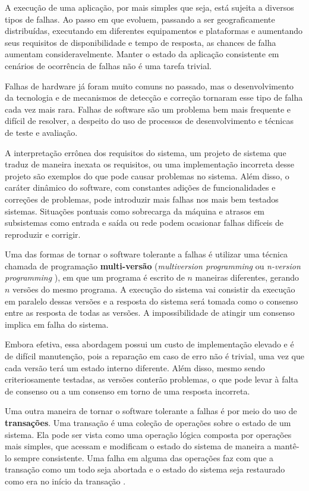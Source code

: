 \documentclass[11pt,twoside,a4paper]{book}
\begin{document}
A execução de uma aplicação, por mais simples que seja, está sujeita a diversos tipos de falhas. Ao passo em que evoluem, passando a ser geograficamente distribuídas, executando em diferentes equipamentos e plataformas e aumentando seus requisitos de disponibilidade e tempo de resposta, as chances de falha aumentam consideravelmente. Manter o estado da aplicação consistente em cenários de ocorrência de falhas não é uma tarefa trivial.

Falhas de hardware já foram muito comuns no passado, mas o desenvolvimento da tecnologia e de mecanismos de detecção e correção tornaram esse tipo de falha cada vez mais rara. Falhas de software são um problema bem mais frequente e difícil de resolver, a despeito do uso de processos de desenvolvimento e técnicas de teste e avaliação.

A interpretação errônea dos requisitos do sistema, um projeto de sistema que traduz de maneira inexata os requisitos, ou uma implementação incorreta desse projeto são exemplos do que pode causar problemas no sistema. Além disso, o caráter dinâmico do software, com constantes adições de funcionalidades e correções de problemas, pode introduzir mais falhas nos mais bem testados sistemas. Situações pontuais como sobrecarga da máquina e atrasos em subsistemas como entrada e saída ou rede podem ocasionar falhas difíceis de reproduzir e corrigir.

Uma das formas de tornar o software tolerante a falhas é utilizar uma técnica chamada de programação \textbf{multi-versão} (\emph{multiversion programming} ou \emph{n-version programming} \cite{n_version}), em que um programa é escrito de $n$ maneiras diferentes, gerando $n$ versões do mesmo programa. A execução do sistema vai consistir da execução em paralelo dessas versões e a resposta do sistema será tomada como o consenso entre as resposta de todas as versões. A impossibilidade de atingir um consenso implica em falha do sistema.

Embora efetiva, essa abordagem possui um custo de implementação elevado e é de difícil manutenção, pois a reparação em caso de erro não é trivial, uma vez que cada versão terá um estado interno diferente. Além disso, mesmo sendo criteriosamente testadas, as versões conterão problemas, o que pode levar à falta de consenso ou a um consenso em torno de uma resposta incorreta.

Uma outra maneira de tornar o software tolerante a falhas é por meio do uso de \textbf{transações}. Uma transação é uma coleção de operações sobre o estado de um sistema. Ela pode ser vista como uma operação lógica composta por operações mais simples, que acessam e modificam o estado do sistema de maneira a mantê-lo sempre consistente. Uma falha em alguma das operações faz com que a transação como um todo seja abortada e o estado do sistema seja restaurado como era no início da transação \cite{garcia-molina, vaca, gray}.
\end{document}
